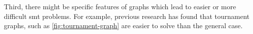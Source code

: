 Third, there might be specific features of graphs which lead to easier or more
difficult \ac{smt} problems. For example, previous research has found that
tournament graphs, such as \autoref{fig:tournament-graph} are easier to solve
than the general case.

